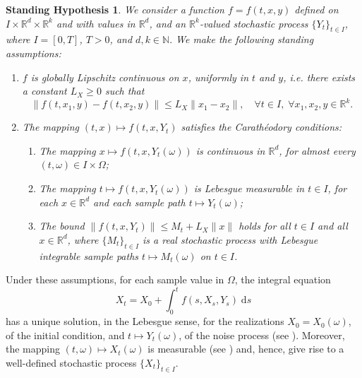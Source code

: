 \documentclass[reqno,12pt]{amsart}
\theoremstyle{plain} %
\newtheorem{stdhyp}{Standing Hypothesis}[section]
\theoremstyle{definition} %
\begin{document}
\begin{stdhyp}
    \label{standinghypotheses1}
    We consider a function $f=f(t, x, y)$ defined on $I\times \mathbb{R}^d\times\mathbb{R}^k$ and with values in $\mathbb{R}^d$, and an $\mathbb{R}^k$-valued stochastic process $\{Y_t\}_{t\in I}$, where $I=[0, T]$, $T > 0$, and $d, k\in \mathbb{N}.$ We make the following standing assumptions:
    \begin{enumerate}
        \item \label{standinghypotheses1Lx} $f$ is globally Lipschitz continuous on $x$, uniformly in $t$ and $y$, i.e. there exists a constant $L_X \geq 0$ such that
            \begin{equation}
                \label{Lxassumptionbasic}
                \|f(t, x_1, y) - f(t, x_2, y)\| \leq L_X \|x_1 - x_2\|, \quad \forall t \in I, \;\forall x_1, x_2, y\in\mathbb{R}^k.
            \end{equation}

        \item \label{standinghypotheses1Car} The mapping $(t, x) \mapsto f(t, x, Y_t)$ satisfies the Carath\'eodory conditions:
            \begin{enumerate}
                \item The mapping $x \mapsto f(t, x, Y_t(\omega))$ is continuous in $\mathbb{R}^d$, for almost every $(t, \omega)\in I\times \Omega$;
                \item The mapping $t \mapsto f(t, x, Y_t(\omega))$ is Lebesgue measurable in $t\in I$, for each $x\in \mathbb{R}^d$ and each sample path $t \mapsto Y_t(\omega)$;
                \item \label{standinghypotheses1Carboundonf} The bound $\|f(t, x, Y_t)\| \leq M_t + L_X\|x\|$ holds for all $t\in I$ and all $x\in\mathbb{R}^d$, where $\{M_t\}_{t\in I}$ is a real stochastic process with Lebesgue integrable sample paths $t\mapsto M_t(\omega)$ on $t\in I$.
            \end{enumerate}
    \end{enumerate}
\end{stdhyp}

Under these assumptions, for each sample value in $\Omega$, the integral equation
\begin{equation}
    \label{integralrodeform}
    X_t = X_0 + \int_0^t f(s, X_s, Y_s) \;\mathrm{d}s
\end{equation}
has a unique solution, in the Lebesgue sense, for the realizations $X_0 = X_0(\omega)$, of the initial condition, and $t\mapsto Y_t(\omega)$, of the noise process (see \cite[Theorem 1.1]{CoddingtonLevinson1985}). Moreover, the mapping $(t, \omega) \mapsto X_t(\omega)$ is measurable (see \cite[Section 2.1.2]{HanKloeden2017}) and, hence, give rise to a well-defined stochastic process $\{X_t\}_{t\in I}$.
\end{document}
